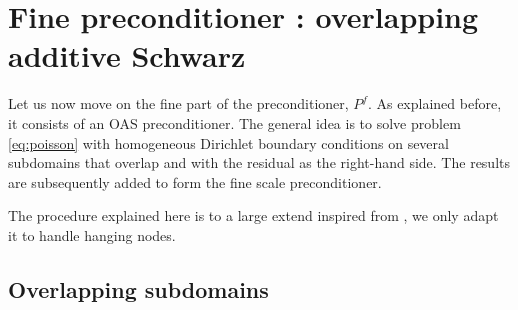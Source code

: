 \section{Fine preconditioner : overlapping additive Schwarz}

Let us now move on the fine part of the preconditioner, $P^f$. As explained before, it consists of an OAS preconditioner. The general idea is to solve problem \ref{eq:poisson} with homogeneous Dirichlet boundary conditions on several subdomains that overlap and with the residual as the right-hand side. The results are subsequently added to form the fine scale preconditioner. 

The procedure explained here is to a large extend inspired from \cite{remacle}, we only adapt it to handle hanging nodes. 

\subsection{Overlapping subdomains}

